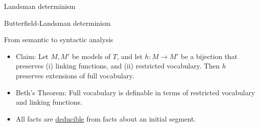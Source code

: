 \documentclass[fleqn]{beamer}
\begin{document}
\begin{frame}{Landsman determinism}

  
\end{frame}




\begin{frame}{Butterfield-Landsman determinism}


\end{frame}

\begin{frame}{From semantic to syntactic analysis}

  \begin{itemize}
  \item Claim: Let $M,M'$ be models of $T$, and let $h:M\to M'$ be a
    bijection that preserves (i) linking functions, and (ii)
    restricted vocabulary. Then $h$ preserves extensions of full
    vocabulary.
  \item Beth's Theorem: Full vocabulary is definable in terms of
    restricted vocabulary and linking functions.
  \item All facts are \underline{deducible} from facts about an
    initial segment.
  \end{itemize}


\end{frame}
\end{document}
